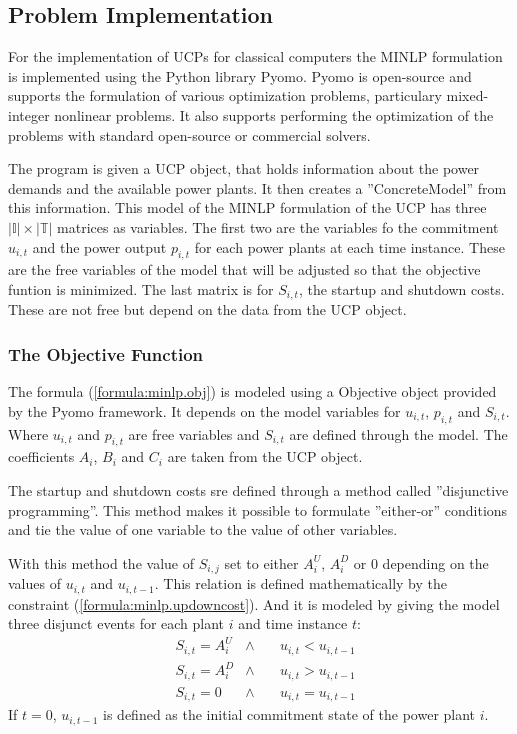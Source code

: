 \subsection{Problem Implementation}

For the implementation of UCPs for classical computers
the MINLP formulation is implemented using the Python library Pyomo.
Pyomo is open-source and supports the formulation of various optimization problems,
particulary mixed-integer nonlinear problems.
It also supports performing the optimization of the problems
with standard open-source or commercial solvers.
\cite{hart2011pyomo}

The program is given a UCP object, that holds information
about the power demands and the available power plants.
It then creates a ''ConcreteModel'' from this information.
This model of the MINLP formulation of the UCP
has three $| \mathbb{I} | \times | \mathbb{T} |$ matrices as variables.
The first two are the variables fo the commitment $u_{i, t}$
and the power output $p_{i, t}$ for each power plants at each time instance.
These are the free variables of the model that will be adjusted so that the objective funtion is minimized.
The last matrix is for $S_{i, t}$, the startup and shutdown costs.
These are not free but depend on the data from the UCP object.


\subsubsection{The Objective Function}

The formula (\ref{formula:minlp.obj}) is modeled using a Objective object provided by the Pyomo framework.
It depends on the model variables for $u_{i, t}$, $p_{i, t}$ and $S_{i, t}$.
Where $u_{i, t}$ and $p_{i, t}$ are free variables and $S_{i, t}$ are defined through the model.
The coefficients $A_i$, $B_i$ and $C_i$ are taken from the UCP object.


The startup and shutdown costs sre defined through a method called ''disjunctive programming''.
This method makes it possible to formulate ''either-or'' conditions
and tie the value of one variable to the value of other variables.
\cite{Balas1983}

With this method the value of $S_{i, j}$ set to either $A^U_i$, $A^D_i$ or $0$
depending on the values of $u_{i, t}$ and $u_{i, t-1}$.
This relation is defined mathematically by the constraint (\ref{formula:minlp.updowncost}).
And it is modeled by giving the model three disjunct events for each plant $i$ and time instance $t$:
\begin{subequations}
\begin{align}
  & S_{i, t} = A^U_i & \land \quad & u_{i, t} < u_{i, t-1} \\
  & S_{i, t} = A^D_i & \land \quad & u_{i, t} > u_{i, t-1} \\
  & S_{i, t} = 0 & \land \quad & u_{i, t} = u_{i, t-1}
\end{align}
\end{subequations}
If $t = 0$, $u_{i, t-1}$ is defined as the initial commitment state of the power plant $i$.

